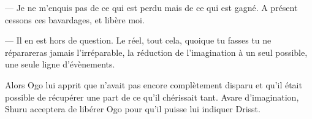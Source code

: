 --- Je ne m'enquis pas de ce qui est perdu mais de ce qui est gagné. A présent cessons ces bavardages, et libère moi.

--- Il en est hors de question. Le réel, tout cela, quoique tu fasses tu ne réparareras jamais l'irréparable, la réduction de l'imagination à un seul possible, une seule ligne d'évènements.

Alors Ogo lui apprit que \Mey n'avait pas encore complètement disparu et qu'il était possible de récupérer une part de ce qu'il chérissait tant. Avare d'imagination, Shuru acceptera de libérer Ogo pour qu'il puisse lui indiquer Drisst.  
   
